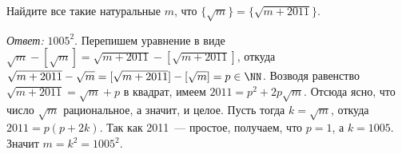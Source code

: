 Найдите все такие натуральные $m$, что
$\{ \sqrt{m} \} = \{ \sqrt{m+2011} \}$.

\solution
\emph{Ответ:} $1005^2$.
Перепишем уравнение в виде
$\sqrt{m} - [\sqrt{m}] = \sqrt{m + 2011} - [\sqrt{m + 2011}]$,
откуда
\(
    \sqrt{m + 2011} - \sqrt{m}
=
    [\sqrt{m + 2011}] - [\sqrt{m}]
=
    p \in \NN
\).
Возводя равенство $\sqrt{m + 2011} = \sqrt{m} + p$ в квадрат, имеем
$2011 = p^2 + 2 p \sqrt{m}$.
Отсюда ясно, что число $\sqrt{m}$ рациональное, а значит, и целое.
Пусть тогда $k = \sqrt{m}$, откуда $2011 = p (p + 2 k)$.
Так как 2011~--- простое, получаем, что $p=1$, а $k = 1005$.
Значит $m = k^2 = 1005^2$.


